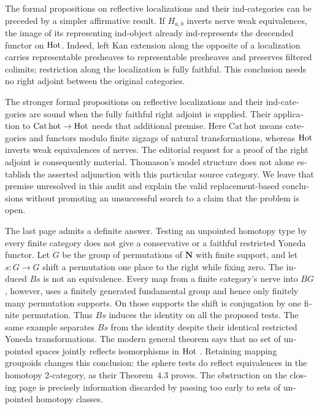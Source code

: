 \begin{otherlanguage}{english}
The formal propositions on reflective localizations and their ind-categories
can be preceded by a simpler affirmative result. If $H_{a,b}$ inverts nerve
weak equivalences, the image of its representing ind-object already
ind-represents the descended functor on $\mathrm{Hot}$. Indeed, left Kan extension
along the opposite of a localization carries representable presheaves to
representable presheaves and preserves filtered colimits; restriction along
the localization is fully faithful. This conclusion needs no right adjoint
between the original categories.

The stronger formal propositions on reflective localizations and their ind-categories
are sound when the fully faithful right adjoint is supplied. Their application
to $\mathrm{Cat\,hot}\to\mathrm{Hot}$ needs that additional premise. Here
$\mathrm{Cat\,hot}$ means categories and functors modulo finite zigzags of
natural transformations, whereas $\mathrm{Hot}$ inverts weak equivalences of nerves.
The editorial request for a proof of the right adjoint is consequently
material. Thomason's model structure does not alone establish the asserted
adjunction with this particular source category. We leave that premise
unresolved in this audit and explain the valid replacement-based conclusions
without promoting an unsuccessful search to a claim that the problem is open.

The last page admits a definite answer. Testing an unpointed homotopy type
by every finite category does not give a conservative or a faithful restricted
Yoneda functor. Let $G$ be the group of permutations of $\mathbf N$ with finite
support, and let $s:G\to G$ shift a permutation one place to the right while
fixing zero. The induced $Bs$ is not an equivalence. Every map from a finite
category's nerve into $BG$, however, uses a finitely generated fundamental
group and hence only finitely many permutation supports. On those supports
the shift is conjugation by one finite permutation. Thus $Bs$ induces the
identity on all the proposed tests. The same example separates $Bs$ from
the identity despite their identical restricted Yoneda transformations.
The modern general theorem says that no set of unpointed spaces jointly
reflects isomorphisms in $\mathrm{Hot}$ \citep[Theorem~2.1 and Remark~2.3]{ArlinChristensen2023}.
Retaining mapping groupoids changes this conclusion: the sphere tests do
reflect equivalences in the homotopy 2-category, as their Theorem~4.3 proves.
The obstruction on the closing page is precisely information discarded by
passing too early to sets of unpointed homotopy classes.
\end{otherlanguage}
\dgrchunkend
